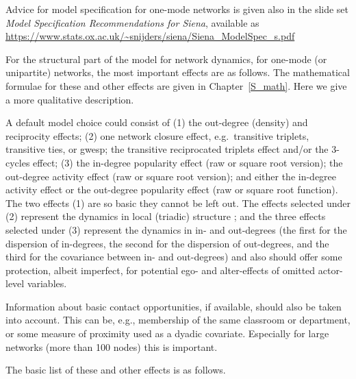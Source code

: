 \documentclass[a4paper,fleqn,11pt]{article}
\newcommand{\+}{\, + \,}
\begin{document}
Advice for model specification for one-mode networks is given
also in the slide set
\emph{Model Specification Recommendations for Siena}, available as\\
\url{https://www.stats.ox.ac.uk/~snijders/siena/Siena_ModelSpec_s.pdf}

For the structural part of the model for network dynamics,
for one-mode (or unipartite) networks,
the most important effects are as follows.
The mathematical formulae for these and other effects are given
in Chapter~\ref{S_math}. Here we give a more qualitative description.

A default model choice could consist of (1) the out-degree (density)
and reciprocity effects; (2) one network closure effect,
e.g.\ transitive triplets, transitive ties, or gwesp;
the transitive reciprocated triplets effect
and/or the 3-cycles effect;
(3) the in-degree popularity effect (raw or square root version);
the out-degree activity effect (raw or square root version);
and either the in-degree activity effect or the out-degree popularity effect
(raw or square root function).
The two effects (1) are so basic they cannot be left out.
The effects selected under (2) represent the dynamics in local (triadic) structure
\citep[also see][for the transitive reciprocated triplets effect]{Block2015};
and the three effects selected under (3) represent the dynamics
in in- and out-degrees (the first for the dispersion of in-degrees,
the second for the dispersion of out-degrees, and the third for the
covariance between in- and out-degrees) and also should offer
some protection, albeit imperfect, for potential ego- and alter-effects
of omitted actor-level variables.

Information about basic contact opportunities, if available,
should also be taken into account. This can be, e.g., membership
of the same classroom or department, or some measure of
proximity used as a dyadic covariate. Especially for large networks
(more than 100 nodes) this is important.

The basic list of these and other effects is as follows.
\end{document}
